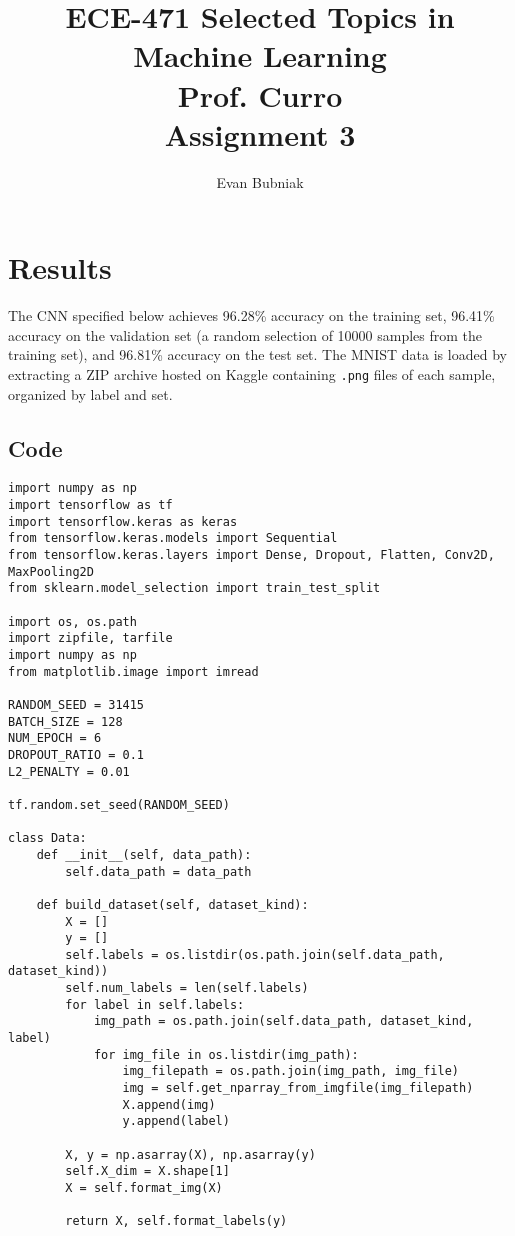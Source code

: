 \documentclass[12pt]{article}
\title{%
   ECE-471 Selected Topics in Machine Learning \\
   Prof. Curro \\
   Assignment 3}
\author{Evan Bubniak}
\begin{document}
\maketitle

\section{Results}

The CNN specified below achieves 96.28\% accuracy on the training set, 96.41\% accuracy on the validation set (a random selection of 10000 samples from the training set), and 96.81\% accuracy on the test set. The MNIST data is loaded by extracting a ZIP archive hosted on Kaggle containing \verb|.png| files of each sample, organized by label and set.

\clearpage
\begin{adjustwidth}{-50pt}{0pt}

\section{Code}

\begin{Verbatim}
import numpy as np
import tensorflow as tf
import tensorflow.keras as keras
from tensorflow.keras.models import Sequential
from tensorflow.keras.layers import Dense, Dropout, Flatten, Conv2D, MaxPooling2D
from sklearn.model_selection import train_test_split

import os, os.path
import zipfile, tarfile
import numpy as np
from matplotlib.image import imread

RANDOM_SEED = 31415
BATCH_SIZE = 128
NUM_EPOCH = 6
DROPOUT_RATIO = 0.1
L2_PENALTY = 0.01

tf.random.set_seed(RANDOM_SEED)

class Data:
	def __init__(self, data_path):
		self.data_path = data_path

	def build_dataset(self, dataset_kind):
		X = []
		y = []
		self.labels = os.listdir(os.path.join(self.data_path, dataset_kind))
		self.num_labels = len(self.labels)
		for label in self.labels:
			img_path = os.path.join(self.data_path, dataset_kind, label)
			for img_file in os.listdir(img_path):
				img_filepath = os.path.join(img_path, img_file)
				img = self.get_nparray_from_imgfile(img_filepath)
				X.append(img)
				y.append(label)
			
		X, y = np.asarray(X), np.asarray(y)
		self.X_dim = X.shape[1]
		X = self.format_img(X)
		
		return X, self.format_labels(y)


\end{Verbatim}
\end{adjustwidth}
\end{document}
